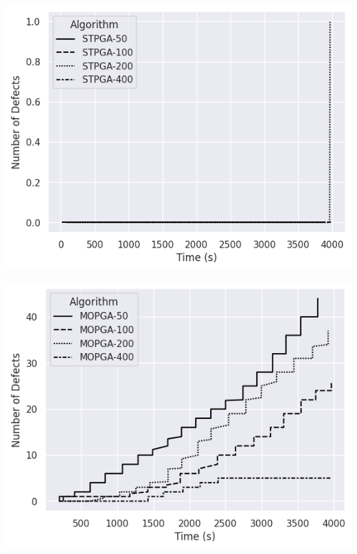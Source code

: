 \begin{minipage}{\textwidth}
\vspace{0.25cm}
  \begin{minipage}[b]{0.49\textwidth}
    \centering
    \includegraphics[scale=0.4]{img/rq1-3/rq1-3-conv1.png}
    \label{fig:rq1-3conv1}
  \end{minipage}
  \hfill
  \begin{minipage}[b]{0.49\textwidth}
    \centering
    \includegraphics[scale=0.4]{img/rq1-3/rq1-3-conv2.png}
    \label{fig:rq1-3conv2}
\end{minipage}
\vspace{0.25cm}
\end{minipage}

